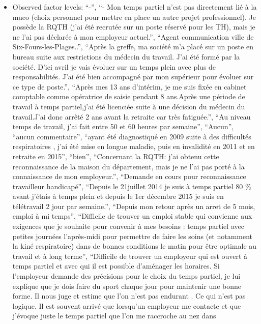 \documentclass[
  letterpaper,
  DIV=11,
  numbers=noendperiod]{scrartcl}
\providecommand{\tightlist}{%
  \setlength{\itemsep}{0pt}\setlength{\parskip}{0pt}}
\begin{document}
\begin{itemize}
\tightlist
\item
  Observed factor levels: ``-'', ``- Mon temps partiel n'est pas
  directement lié à la muco (choix personnel pour mettre en place un
  autre projet professionnel). Je possède la RQTH (j'ai été recrutée sur
  un poste réservé pour les TH), mais je ne l'ai pas déclarée à mon
  employeur actuel.'', ``Agent communication ville de
  Six-Fours-les-Plages..'', ``Après la greffe, ma société m'a placé sur
  un poste en bureau suite aux restrictions du médecin du travail. J'ai
  été formé par la société. D'ici avril je vais évoluer sur un temps
  plein avec plus de responsabilités. J'ai été bien accompagné par mon
  supérieur pour évoluer sur ce type de poste.'', ``Après mes 13 ans
  d'intérim, je me suis fixée en cabinet comptable comme opératrice de
  saisie pendant 8 ans.Après une période de travail à temps partiel,j'ai
  été licenciée suite à une décision du médecin du travail.J'ai donc
  arrêté 2 ans avant la retraite car très fatiguée.'', ``Au niveau temps
  de travail, j'ai fait entre 50 et 60 heures par semaine'', ``Aucun'',
  ``aucun commentaire'', ``ayant été diagnostiqué en 2009 suite à des
  difficultés respiratoires , j'ai été mise en longue maladie, puis en
  invalidité en 2011 et en retraite en 2015'', ``bien'', ``Concernant la
  RQTH: j'ai obtenu cette reconnaissance de la maison du département,
  mais je ne l'ai pas porté à la connaissance de mon employeur.'',
  ``Demande en cours pour reconnaissance travailleur handicapé'',
  ``Depuis le 21juillet 2014 je suis à temps partiel 80 \% avant j'étais
  à temps plein et depuis le 1er décembre 2015 je suis en télétravail 2
  jour par semaine.'', ``Depuis mon retour après un arret de 5 mois,
  emploi à mi temps'', ``Difficile de trouver un emploi stable qui
  convienne aux exigences que je souhaite pour convenir à mes besoins :
  temps partiel avec petites journées l'après-midi pour permettre de
  faire les soins (et notamment la kiné respiratoire) dans de bonnes
  conditions le matin pour être optimale au travail et à long terme'',
  ``Difficile de trouver un employeur qui est ouvert à temps partiel et
  avec qui il est possible d'aménager les horaires. Si l'employeur
  demande des précisions pour le choix du temps partiel, je lui explique
  que je dois faire du sport chaque jour pour maintenir une bonne forme.
  Il nous juge et estime que l'on n'est pas endurant . Ce qui n'est pas
  logique. Il est souvent arrivé que lorsqu'un employeur me contacte et
  que j'évoque juste le temps partiel que l'on me raccroche au nez dans

\end{itemize}
\end{document}
